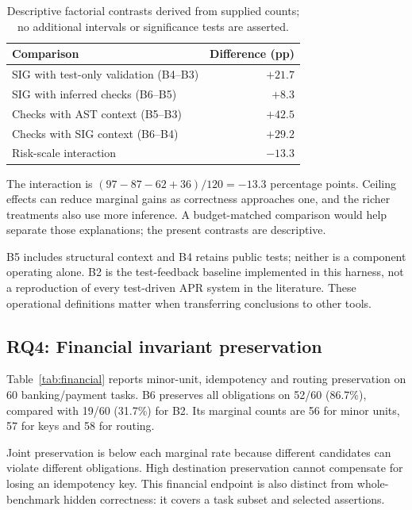 \begin{table}[t]\centering\small
\caption{Descriptive factorial contrasts derived from supplied counts; no additional intervals or significance tests are asserted.}\label{tab:factorial}
\begin{tabularx}{\columnwidth}{@{}Xr@{}}\toprule
Comparison & Difference (pp)\\\midrule
SIG with test-only validation (B4--B3) & $+21.7$\\
SIG with inferred checks (B6--B5) & $+8.3$\\
Checks with AST context (B5--B3) & $+42.5$\\
Checks with SIG context (B6--B4) & $+29.2$\\
Risk-scale interaction & $-13.3$\\\bottomrule
\end{tabularx}
\end{table}

The interaction is $(97-87-62+36)/120=-13.3$ percentage points. Ceiling effects can reduce marginal gains as correctness approaches one, and the richer treatments also use more inference. A budget-matched comparison would help separate those explanations; the present contrasts are descriptive.

B5 includes structural context and B4 retains public tests; neither is a component operating alone. B2 is the test-feedback baseline implemented in this harness, not a reproduction of every test-driven APR system in the literature. These operational definitions matter when transferring conclusions to other tools.

\subsection{RQ4: Financial invariant preservation}
Table~\ref{tab:financial} reports minor-unit, idempotency and routing preservation on 60 banking/payment tasks. B6 preserves all obligations on 52/60 (86.7\%), compared with 19/60 (31.7\%) for B2. Its marginal counts are 56 for minor units, 57 for keys and 58 for routing.

Joint preservation is below each marginal rate because different candidates can violate different obligations. High destination preservation cannot compensate for losing an idempotency key. This financial endpoint is also distinct from whole-benchmark hidden correctness: it covers a task subset and selected assertions.

